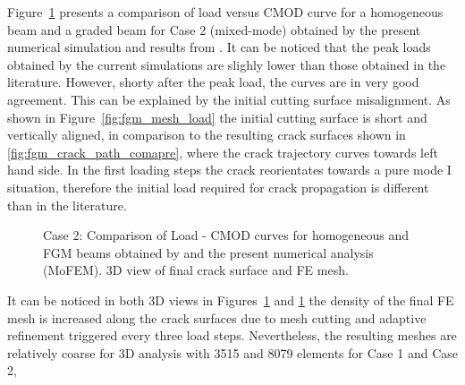 \documentclass[onecolumn]{svjour3}
\begin{document}
% 
% 
Figure~\ref{fig:fgm_case2} presents a comparison of load versus CMOD curve for a homogeneous beam and a graded beam for Case 2 (mixed-mode) obtained by the present numerical simulation and results from \citep{kim2004simulation}. It can be noticed that the peak loads obtained by the current simulations are slighly lower than those obtained in the literature. However, shorty after the peak load, the curves are in very good agreement. This can be explained by the initial cutting surface misalignment. As shown in Figure~\ref{fig:fgm_mesh_load} the initial cutting surface is short and vertically aligned, in comparison to the resulting crack surfaces shown in \ref{fig:fgm_crack_path_comapre}, where the crack trajectory curves towards left hand side. In the first loading steps the crack reorientates towards a pure mode I situation, therefore the initial load required for crack propagation is different than in the literature.
% 
\begin{figure}
	\centering
	\caption{Case 2: Comparison of Load - CMOD curves for homogeneous and FGM beams obtained by \citep{kim2004simulation} and the present numerical analysis (MoFEM). 3D view of final crack surface and FE mesh.}
	\label{fig:fgm_case2}
\end{figure}
% 
It can be noticed in both 3D views in Figures~\ref{fig:fgm_case2} and \ref{fig:fgm_case2} the density of the final FE mesh is increased along the crack surfaces due to mesh cutting and adaptive refinement triggered every three load steps. Nevertheless, the resulting meshes are relatively coarse for 3D analysis with 3515 and 8079 elements for Case 1 and Case 2, 
% 
\end{document}
